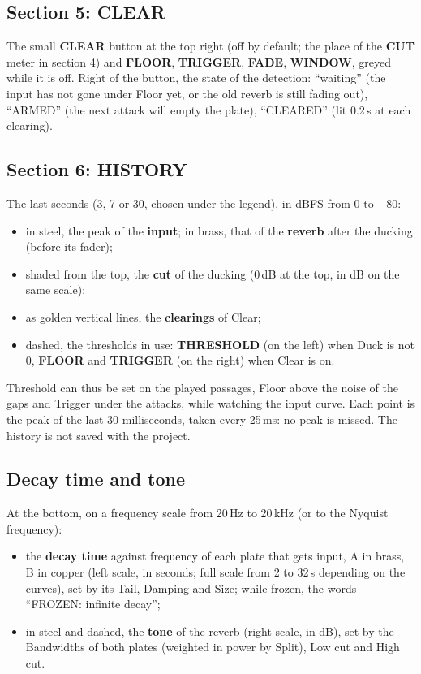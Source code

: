 \documentclass[a4paper,11pt]{article}
\newcommand{\ctl}[1]{\textsf{\textbf{#1}}}   %
\newcommand{\dB}{\,dB}
\begin{document}
\subsection{Section 5: CLEAR}
The small \ctl{CLEAR} button at the top right (off by default; the place of the \ctl{CUT} meter
in section 4) and \ctl{FLOOR}, \ctl{TRIGGER}, \ctl{FADE}, \ctl{WINDOW}, greyed while it is off.
Right of the button, the state of the detection:
``waiting'' (the input has not gone under Floor yet, or the old reverb is still fading
out), ``ARMED'' (the next attack will empty the plate), ``CLEARED'' (lit 0.2\,s at
each clearing).

\subsection{Section 6: HISTORY}
The last seconds (3, 7 or 30, chosen under the legend), in dBFS from 0 to $-80$:
\begin{itemize}
\item in steel, the peak of the \textbf{input}; in brass, that of the \textbf{reverb} after the
  ducking (before its fader);
\item shaded from the top, the \textbf{cut} of the ducking (0\dB{} at the top, in dB on the same
  scale);
\item as golden vertical lines, the \textbf{clearings} of Clear;
\item dashed, the thresholds in use: \ctl{THRESHOLD} (on the left) when Duck is not 0,
  \ctl{FLOOR} and \ctl{TRIGGER} (on the right) when Clear is on.
\end{itemize}
Threshold can thus be set on the played passages, Floor above the noise of the gaps and Trigger
under the attacks, while watching the input curve. Each point is the peak of the last
30 milliseconds, taken every 25\,ms: no peak is missed. The history is not saved with the
project.

\subsection{Decay time and tone}
At the bottom, on a frequency scale from 20\,Hz to 20\,kHz (or to the Nyquist frequency):
\begin{itemize}
\item the \textbf{decay time} against frequency of each plate that gets input, A in brass, B in
  copper (left scale, in seconds; full scale from 2 to 32\,s depending on the curves), set by its
  Tail, Damping and Size; while frozen, the words ``FROZEN: infinite decay'';
\item in steel and dashed, the \textbf{tone} of the reverb (right scale, in dB), set by the
  Bandwidths of both plates (weighted in power by Split), Low cut and High cut.
\end{itemize}
\end{document}

